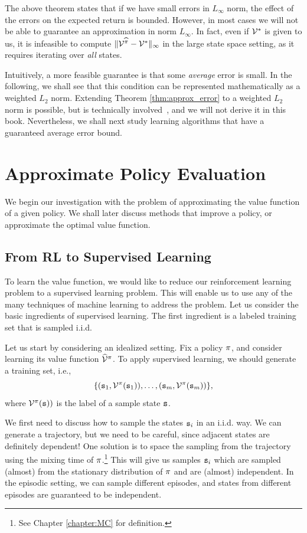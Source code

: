 The above theorem states that if we have small errors in
$L_\infty$ norm, the effect of the errors on the expected return is
bounded. However, in most cases we will not be able to guarantee an
approximation in norm $L_\infty$. In fact, even if $\mathcal{V}^*$ is given to us, it is infeasible to compute $\|\mathcal{V}^{\widehat{\pi}}-\mathcal{V}^*\|_\infty$ in the large state space setting, as it requires iterating over \textit{all} states. 

Intuitively, a more feasible guarantee is that some \textit{average} error is small. In the following, we shall see that this condition can be represented mathematically as a weighted $L_2$ norm. Extending Theorem \ref{thm:approx_error} to a weighted $L_2$ norm is possible, but is technically involved~\cite{munos2007performance}, and we will not derive it in this book. Nevertheless, we shall next study learning algorithms that have a guaranteed average error bound.

\section{Approximate Policy Evaluation}\label{sec:approx_policy_eval}

We begin our investigation with the problem of approximating the value function of a given policy. We shall later discuss methods that improve a policy, or approximate the optimal value function.


\subsection{From RL to Supervised Learning}

To learn the value function, we would like to reduce our reinforcement learning problem to a
supervised learning problem. This will enable us to use any of the many techniques of machine learning to address the problem. Let us consider the basic ingredients of supervised learning. The first ingredient is a labeled training set that is sampled i.i.d.

Let us start by considering an idealized setting. Fix a policy $\pi$, and consider learning its value function $\widehat{\mathcal{V}}^{\pi}$. To apply supervised learning, we should
generate a training set, i.e., 
\[
\{({\tt s}_1, \mathcal{V}^\pi({\tt s}_1)),\ldots,
({\tt s}_m,\mathcal{V}^\pi({\tt s}_m))\},
\]
where $\mathcal{V}^\pi({\tt s}))$ is the label of a sample state ${\tt s}$.

We first need to discuss how to sample the states ${\tt s}_i$ in an
i.i.d. way. We can generate a trajectory, but we need to be careful,
since adjacent states are definitely dependent! One solution is to
space the sampling from the trajectory using the mixing time of
$\pi$.\footnote{See Chapter \ref{chapter:MC} for definition.}
This will give us samples ${\tt s}_i$ which are sampled (almost) from the
stationary distribution of $\pi$ and are (almost) independent. In the episodic setting, we can sample different episodes, and states from different episodes are guaranteed to be independent.

